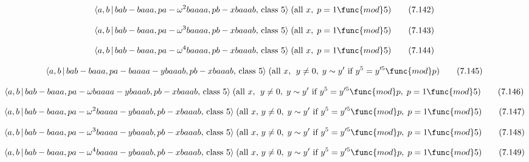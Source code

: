 \documentclass[10pt]{article}
\begin{document}
\begin{equation}
\langle a,b\,|\,bab-baaa,pa-\omega ^{2}baaaa,pb-xbaaab,\,\text{class }%
5\rangle \;(\text{all }x,\;p=1\func{mod}5)  \tag{7.142}
\end{equation}

\begin{equation}
\langle a,b\,|\,bab-baaa,pa-\omega ^{3}baaaa,pb-xbaaab,\,\text{class }%
5\rangle \;(\text{all }x,\;p=1\func{mod}5)  \tag{7.143}
\end{equation}

\begin{equation}
\langle a,b\,|\,bab-baaa,pa-\omega ^{4}baaaa,pb-xbaaab,\,\text{class }%
5\rangle \;(\text{all }x,\;p=1\func{mod}5)  \tag{7.144}
\end{equation}

\begin{equation}
\langle a,b\,|\,bab-baaa,pa-baaaa-ybaaab,pb-xbaaab,\,\text{class }5\rangle
\;(\text{all }x,\,\;y\neq 0,\;y\sim y^{\prime }\text{ if }y^{5}=y^{\prime 5}%
\func{mod}p)  \tag{7.145}
\end{equation}

\begin{equation}
\langle a,b\,|\,bab-baaa,pa-\omega baaaa-ybaaab,pb-xbaaab,\,\text{class }%
5\rangle \;(\text{all }x,\;\,y\neq 0,\;y\sim y^{\prime }\text{ if }%
y^{5}=y^{\prime 5}\func{mod}p,\;p=1\func{mod}5)  \tag{7.146}
\end{equation}

\begin{equation}
\langle a,b\,|\,bab-baaa,pa-\omega ^{2}baaaa-ybaaab,pb-xbaaab,\,\text{class }%
5\rangle \;(\text{all }x,\,y\neq 0,\;y\sim y^{\prime }\text{ if }%
y^{5}=y^{\prime 5}\func{mod}p,\;p=1\func{mod}5)  \tag{7.147}
\end{equation}

\begin{equation}
\langle a,b\,|\,bab-baaa,pa-\omega ^{3}baaaa-ybaaab,pb-xbaaab,\,\text{class }%
5\rangle \;(\text{all }x,\,y\neq 0,\;y\sim y^{\prime }\text{ if }%
y^{5}=y^{\prime 5}\func{mod}p,\;p=1\func{mod}5)  \tag{7.148}
\end{equation}

\begin{equation}
\langle a,b\,|\,bab-baaa,pa-\omega ^{4}baaaa-ybaaab,pb-xbaaab,\,\text{class }%
5\rangle \;(\text{all }x,\,y\neq 0,\;y\sim y^{\prime }\text{ if }%
y^{5}=y^{\prime 5}\func{mod}p,\;p=1\func{mod}5)  \tag{7.149}
\end{equation}
\end{document}
